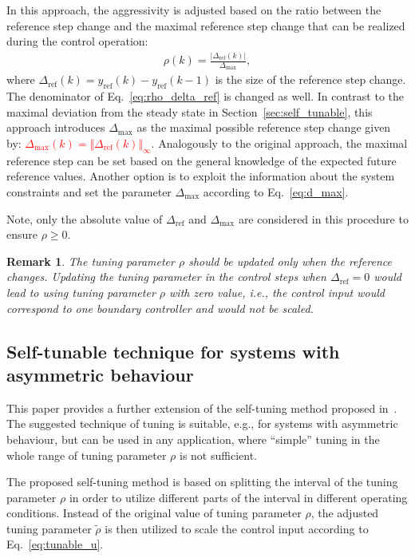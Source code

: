 \documentclass[preprint,12pt]{elsarticle}
\newtheorem{remark}[theorem]{Remark}
\begin{document}
	In this approach, the aggressivity is adjusted based on the ratio between the reference step change and the maximal reference step change that can be realized during the control operation:
	\begin{eqnarray}
		\label{eq:rho_delta_ref}
		\rho(k) = \frac{\vert \Delta_{\mathrm{ref}}(k) \vert}{\Delta_{\max}},
	\end{eqnarray} 
	where $\Delta_{\mathrm{ref}}(k) = y_{\mathrm{ref}}(k) - y_{\mathrm{ref}}(k-1)$ is the size of the reference step change. The denominator of Eq.~\eqref{eq:rho_delta_ref} is changed as well. In contrast to the maximal deviation from the steady state in Section~\ref{sec:self_tunable}, this approach introduces $\Delta_{\max}$ as the maximal possible reference step change given by: \textcolor{red}{$\Delta_{\max}(k) = \Vert \Delta_{\mathrm{ref}}(k) \Vert_{\infty} $}. 
	Analogously to the original approach, the maximal reference step can be set based on the general knowledge of the expected future reference values. Another option is to exploit the information about the system constraints and set the parameter $\Delta_{\max}$ according to Eq.~\eqref{eq:d_max}. 
	
	Note, only the absolute value of $\Delta_{\mathrm{ref}}$ and $\Delta_{\max}$ are considered in this procedure to ensure $\rho \ge 0$. 
	
	\begin{remark}
		The tuning parameter $\rho$ should be updated only when the reference changes. Updating the tuning parameter in the control steps when $\Delta_{\mathrm{ref}} = 0$ would lead to using tuning parameter $\rho$ with zero value, i.e., the control input would correspond to one boundary controller and would not be scaled.
	\end{remark}
	
	
	\subsection{Self-tunable technique for systems with asymmetric behaviour}
	\label{sec:self_tunable_rho_scaling}
	
	This paper provides a further extension of the self-tuning method proposed in~\cite{self_tunable}. The suggested technique of tuning is suitable, e.g., for systems with asymmetric behaviour, but can be used in any application, where ``simple'' tuning in the whole range of tuning parameter $\rho$ is not sufficient.
	
	The proposed self-tuning method is based on splitting the interval of the tuning parameter $\rho$ in order to utilize different parts of the interval in different operating conditions. Instead of the original value of tuning parameter $\rho$, the adjusted tuning parameter $\widetilde{\rho}$ is then utilized to scale the control input according to Eq.~\eqref{eq:tunable_u}.
	
\end{document}
